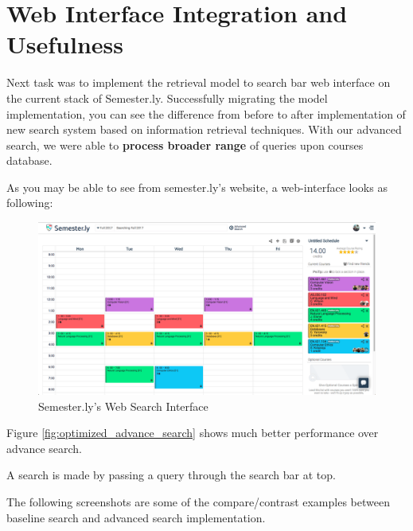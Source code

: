 \documentclass[twoside]{article}
\begin{document}
\vfill
\pagebreak

\section{Web Interface Integration and Usefulness}

Next task was to implement the retrieval model to search bar web interface on the current stack of Semester.ly. Successfully migrating the model implementation, you can see the difference from before to after implementation of new search system based on information retrieval techniques. With our advanced search, we were able to \textbf{process broader range} of queries upon courses database.

As you may be able to see from semester.ly's website, a web-interface looks as following:

\begin{figure}
  \includegraphics[width=\linewidth]{Images/4.png}
  \caption{Semester.ly's Web Search Interface}
  \label{fig:semesterly search}
\end{figure}
Figure \ref{fig:optimized_advance_search} shows much better performance over advance search.

A search is made by passing a query through the search bar at top.

The following screenshots are some of the compare/contrast examples between baseline search and advanced search implementation.
\end{document}
